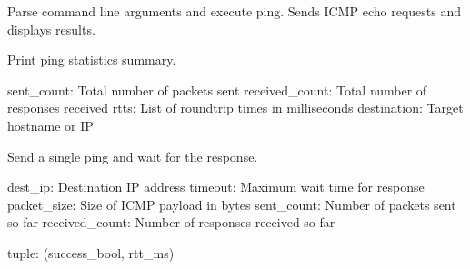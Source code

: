 \documentclass[letterpaper,10pt,english]{sphinxmanual}
\begin{document}

\begin{fulllineitems}
\label{\detokenize{my_ping:my_ping.main}}
\pysigstartsignatures
\pysiglinewithargsret
{}
{}
{}
\pysigstopsignatures
\sphinxAtStartPar
Parse command line arguments and execute ping.
Sends ICMP echo requests and displays results.

\end{fulllineitems}


\begin{fulllineitems}
\label{\detokenize{my_ping:my_ping.print_stats}}
\pysigstartsignatures
\pysiglinewithargsret
{}
{\sphinxparamcomma {}\sphinxparamcomma {}\sphinxparamcomma {}}
{}
\pysigstopsignatures
\sphinxAtStartPar
Print ping statistics summary.
\begin{description}
\sphinxAtStartPar
sent\_count: Total number of packets sent
received\_count: Total number of responses received
rtts: List of round\sphinxhyphen{}trip times in milliseconds
destination: Target hostname or IP

\end{description}

\end{fulllineitems}


\begin{fulllineitems}
\label{\detokenize{my_ping:my_ping.send_ping}}
\pysigstartsignatures
\pysiglinewithargsret
{}
{\sphinxparamcomma {}\sphinxparamcomma {}\sphinxparamcomma {}\sphinxparamcomma {}}
{}
\pysigstopsignatures
\sphinxAtStartPar
Send a single ping and wait for the response.
\begin{description}
\sphinxAtStartPar
dest\_ip: Destination IP address
timeout: Maximum wait time for response
packet\_size: Size of ICMP payload in bytes
sent\_count: Number of packets sent so far
received\_count: Number of responses received so far

\sphinxAtStartPar
tuple: (success\_bool, rtt\_ms)

\end{description}

\end{fulllineitems}
\end{document}
